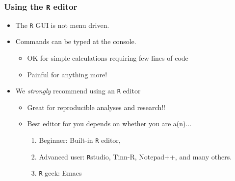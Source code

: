 \documentclass[handout]{beamer}\usepackage[]{graphicx}\usepackage[]{color}
\begin{document}
\begin{frame}
  \frametitle{Using the \texttt{R} editor}
  \begin{itemize}
    \item The \texttt{R} GUI is not menu driven.
    \item Commands can be typed at the console.
    \begin{itemize}
      \item OK for simple calculations requiring few lines of code
      \item Painful for anything more!
    \end{itemize}
    \item We \emph{strongly} recommend using an \texttt{R} editor
    \begin{itemize}
      \item Great for reproducible analyses and research!!
      \item Best editor for you depends on whether you are a(n)...
      \begin{enumerate}
        \item Beginner: Built-in \texttt{R} editor,
        \item Advanced user: \texttt{R}studio, Tinn-R, Notepad++, and many others.
        \item \texttt{R} geek: Emacs
      \end{enumerate}
    \end{itemize}
  \end{itemize}
\end{frame}
\end{document}
